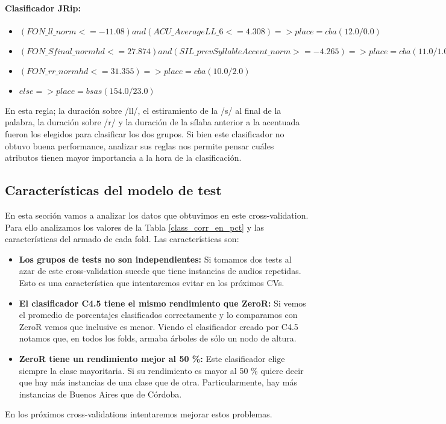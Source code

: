\paragraph*{Clasificador JRip:}

\begin{flushleft}
	\begin{itemize}
		
		\item $(FON\_ll\_norm <= -11.08) and (ACU\_AverageLL\_6 <= 4.308) => place=cba (12.0/0.0)$ \\
		\item $(FON\_Sfinal\_normhd <= 27.874) and (SIL\_prevSyllableAccent\_norm >= -4.265) => place=cba (11.0/1.0)$ \\
		\item $(FON\_rr\_normhd <= 31.355) => place=cba (10.0/2.0)$ \\
		\item $ else  => place=bsas (154.0/23.0)$
	\end{itemize}
\end{flushleft}

En esta regla; la duración sobre /ll/, el estiramiento de la /s/ al final de la palabra, la duración sobre /r/ y la duración de la sílaba anterior a la acentuada fueron los elegidos para clasificar los dos grupos. Si bien este clasificador no obtuvo buena performance, analizar sus reglas nos permite pensar cuáles atributos tienen mayor importancia a la hora de la clasificación.

\subsection{Características del modelo de test}

En esta sección vamos a analizar los datos que obtuvimos en este cross-validation. Para ello analizamos los valores de la Tabla \ref{class_corr_en_pct} y las características del armado de cada fold. Las características son:

\begin{itemize}
	\item \textbf{Los grupos de tests no son independientes:} Si tomamos dos tests al azar de este cross-validation sucede que tiene instancias de audios repetidas. Esto es una característica que intentaremos evitar en los próximos CVs.
	
	\item \textbf{El clasificador C4.5 tiene el mismo rendimiento que ZeroR:} Si vemos el promedio de porcentajes clasificados correctamente y lo comparamos con ZeroR vemos que inclusive es menor. Viendo el clasificador creado por C4.5 notamos que, en todos los folds, armaba árboles de sólo un nodo de altura. 
	
	\item \textbf{ZeroR tiene un rendimiento mejor al 50 \%: } Este clasificador elige siempre la clase mayoritaria. Si su rendimiento es mayor al 50 \% quiere decir que hay más instancias de una clase que de otra. Particularmente, hay más instancias de Buenos Aires que de Córdoba.
\end{itemize}

En los próximos cross-validations intentaremos mejorar estos problemas.

